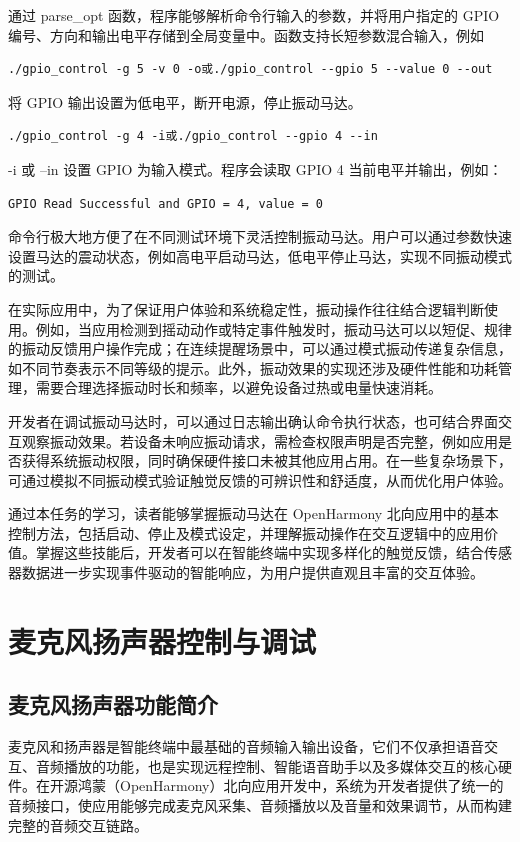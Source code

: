 通过 parse_opt 函数，程序能够解析命令行输入的参数，并将用户指定的 GPIO 编号、方向和输出电平存储到全局变量中。函数支持长短参数混合输入，例如
\begin{lstlisting}[numbers=none]
./gpio_control -g 5 -v 0 -o或./gpio_control --gpio 5 --value 0 --out
\end{lstlisting}

将 GPIO 输出设置为低电平，断开电源，停止振动马达。

\begin{lstlisting}[numbers=none]
./gpio_control -g 4 -i或./gpio_control --gpio 4 --in
\end{lstlisting}

-i 或 --in 设置 GPIO 为输入模式。程序会读取 GPIO 4 当前电平并输出，例如：
\begin{lstlisting}[numbers=none]
GPIO Read Successful and GPIO = 4, value = 0
\end{lstlisting}

命令行极大地方便了在不同测试环境下灵活控制振动马达。用户可以通过参数快速设置马达的震动状态，例如高电平启动马达，低电平停止马达，实现不同振动模式的测试。


在实际应用中，为了保证用户体验和系统稳定性，振动操作往往结合逻辑判断使用。例如，当应用检测到摇动动作或特定事件触发时，振动马达可以以短促、规律的振动反馈用户操作完成；在连续提醒场景中，可以通过模式振动传递复杂信息，如不同节奏表示不同等级的提示。此外，振动效果的实现还涉及硬件性能和功耗管理，需要合理选择振动时长和频率，以避免设备过热或电量快速消耗。

开发者在调试振动马达时，可以通过日志输出确认命令执行状态，也可结合界面交互观察振动效果。若设备未响应振动请求，需检查权限声明是否完整，例如应用是否获得系统振动权限，同时确保硬件接口未被其他应用占用。在一些复杂场景下，可通过模拟不同振动模式验证触觉反馈的可辨识性和舒适度，从而优化用户体验。

通过本任务的学习，读者能够掌握振动马达在 OpenHarmony 北向应用中的基本控制方法，包括启动、停止及模式设定，并理解振动操作在交互逻辑中的应用价值。掌握这些技能后，开发者可以在智能终端中实现多样化的触觉反馈，结合传感器数据进一步实现事件驱动的智能响应，为用户提供直观且丰富的交互体验。
\section{麦克风扬声器控制与调试}
\subsection{麦克风扬声器功能简介}
麦克风和扬声器是智能终端中最基础的音频输入输出设备，它们不仅承担语音交互、音频播放的功能，也是实现远程控制、智能语音助手以及多媒体交互的核心硬件。在开源鸿蒙（OpenHarmony）北向应用开发中，系统为开发者提供了统一的音频接口，使应用能够完成麦克风采集、音频播放以及音量和效果调节，从而构建完整的音频交互链路。

